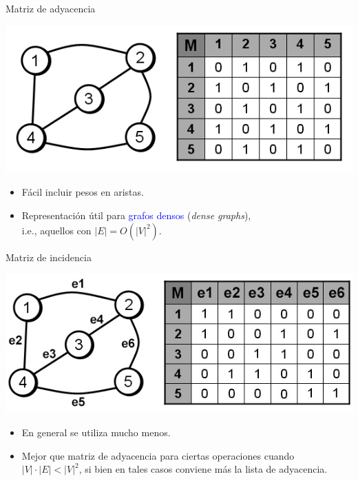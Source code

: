 \documentclass{beamer} %
\newcommand{\blue}[1]{\textcolor{blue}{#1}}
\begin{document}
\begin{frame}{Matriz de adyacencia}
    \begin{center}
      \includegraphics[width=.8\textwidth]{./image/cap6/matriz-adyacencia.jpg}
    \end{center}
    \begin{itemize}
        \item Fácil incluir pesos en aristas.
        \item Representación útil para \blue{grafos densos} ({\em dense graphs}),\\
        i.e., aquellos con $|E|=O(|V|^2)$.
    \end{itemize}
\end{frame}


\begin{frame}{Matriz de incidencia}
    \begin{center}
      \includegraphics[width=.8\textwidth]{./image/cap6/matriz-incidencia.jpg}
    \end{center}
    \begin{itemize}
        \item En general se utiliza mucho menos.
        \item Mejor que matriz de adyacencia para ciertas operaciones cuando $|V|\cdot|E|<|V|^2$, si bien en tales casos conviene más la lista de adyacencia.
    \end{itemize}
\end{frame}
\end{document}

